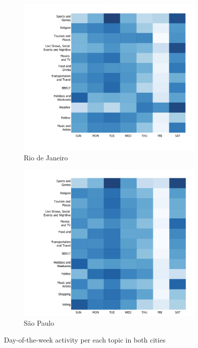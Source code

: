 \begin{figure}[h]
	\centering
	\begin{subfigure}{0.49\textwidth}
		\centering
		\includegraphics[width=1.0\linewidth]{figures/rio_topics_heatmap.pdf}
		\caption{Rio de Janeiro}
		\label{fig:rio}
	\end{subfigure}
	\begin{subfigure}{0.49\textwidth}
		\centering
		\includegraphics[width=1.0\linewidth]{figures/sp_topics_heatmap.pdf}
		\caption{São Paulo}
		\label{fig:sp}
	\end{subfigure}
	\caption[Day-of-the-week Twitter activity]{Day-of-the-week activity per each topic in both cities}
	\label{fig:topics_heat_maps}
\end{figure}

